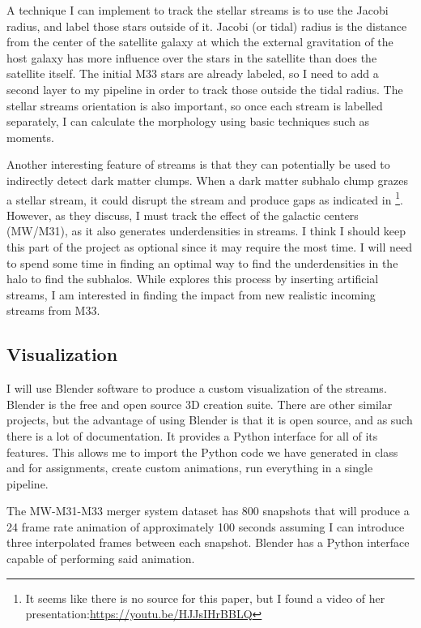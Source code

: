\documentclass{aastex63}
\begin{document}
A technique I can implement to track the stellar streams is to use the Jacobi
radius, and label those stars outside of it. Jacobi (or tidal) radius is the 
distance from the center of the satellite galaxy at which the external gravitation 
of the host galaxy has more influence over the stars in the satellite than does the
satellite itself. The initial M33 stars are already labeled, so I need to add 
a second layer to my pipeline in order to track those outside the tidal radius.
The stellar streams orientation is also important, so once each stream is labelled separately, I can calculate the morphology using basic techniques such as moments.

Another interesting feature of streams is that they can potentially be used to 
indirectly detect dark matter clumps. When a dark matter subhalo clump grazes a 
stellar stream, it could disrupt the stream and produce gaps as indicated in 
\citet{2018AAS...23121203P}\footnote{It seems like there is no source for this 
paper, but I found a video of her presentation:\url{https://youtu.be/HJJsIHrBBLQ}}.
However, as they discuss, I must track the effect of the galactic centers (MW/M31),
as it also generates underdensities in streams. I think I should keep this part of 
the project as optional since it may require the most time. I will need to spend
some time in finding an optimal way to find the underdensities in the halo to
find the subhalos. While \citet{2018AAS...23121203P} explores this process by
inserting artificial streams, I am interested in finding the impact from 
new realistic incoming streams from M33.

\subsection{Visualization\label{subsec:viz}}

I will use Blender software to produce a custom visualization of the streams.
Blender is the free and open source 3D creation suite. There are other similar
projects, but the advantage of using Blender is that it is open source, and as
such there is a lot of documentation. It provides a Python interface for all 
of its features. This allows me to import the Python code we have generated
in class and for assignments, create custom animations, run everything in 
a single pipeline.

The \citet{2012ApJ...753....9V} MW-M31-M33 merger system dataset has 800 
snapshots that will produce a 24 frame rate animation of approximately 100 
seconds assuming I can introduce three interpolated frames between each 
snapshot. Blender has a Python interface capable of performing said animation.
\end{document}

